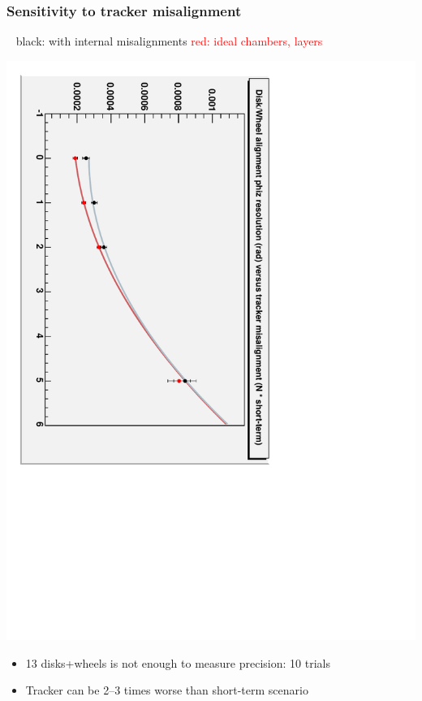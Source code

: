\documentclass[compress]{beamer}
\begin{document}
\begin{frame}
\frametitle{Sensitivity to tracker misalignment}
{\small \mbox{ } \hfill black: with internal misalignments \hfill \textcolor{red}{red: ideal chambers, layers} \hfill \mbox{ }}
\begin{center}
\includegraphics[height=0.7\linewidth, angle=90]{vstracker2.pdf}
\end{center}

\begin{itemize}
\item 13 disks+wheels is not enough to measure precision: 10 trials
\item Tracker can be 2--3 times worse than short-term scenario
\end{itemize}
\end{frame}
\end{document}
